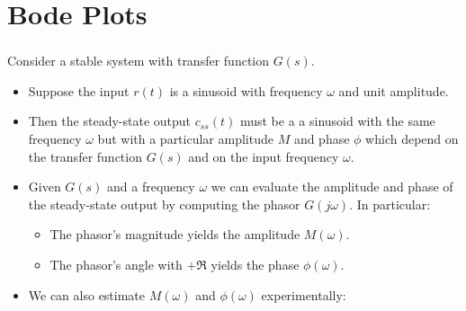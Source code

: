 \documentclass[ 10pt, xcolor = dvipsnames]{beamer}
\begin{document}
\section{Bode Plots}

\begin{frame}[allowframebreaks]
\frametitle{\insertsection}

Consider a stable system with transfer function $G(s)$. 
\begin{itemize}
\item Suppose the input $r(t)$ is a sinusoid with frequency $\omega$ and unit amplitude. 
\item Then the steady-state output $c_{ss}(t)$ must be a a sinusoid with the same frequency $\omega$ but with a particular amplitude $M$ and phase $\phi$ which depend \linebreak on the transfer function $G(s)$ and on the input frequency $\omega$. 
\end{itemize}
\halfskip

\begin{figure}[htb]
\centering
\def\svgwidth{0.8\columnwidth}

\end{figure}
\framebreak

\begin{itemize}
\item Given $G(s)$ and a frequency $\omega$ we can evaluate the amplitude and phase of the steady-state output by computing the phasor $G(j\omega)$. In particular: 
\begin{itemize}
\item The phasor's magnitude yields the amplitude $M(\omega)$. 
\item The phasor's angle with $+\Re$ yields the phase $\phi(\omega)$. 
\end{itemize}
\halfskip
\begin{figure}[htb]
\centering
\def\svgwidth{0.72\columnwidth}

\end{figure}

\end{itemize}
\framebreak

\begin{itemize}
\item We can also estimate $M(\omega)$ and $\phi(\omega)$ experimentally: 
\halfskip
\begin{figure}[htb]
\centering
\def\svgwidth{0.8\columnwidth}

\end{figure}
\end{itemize}
\framebreak


\end{frame}
\end{document}
